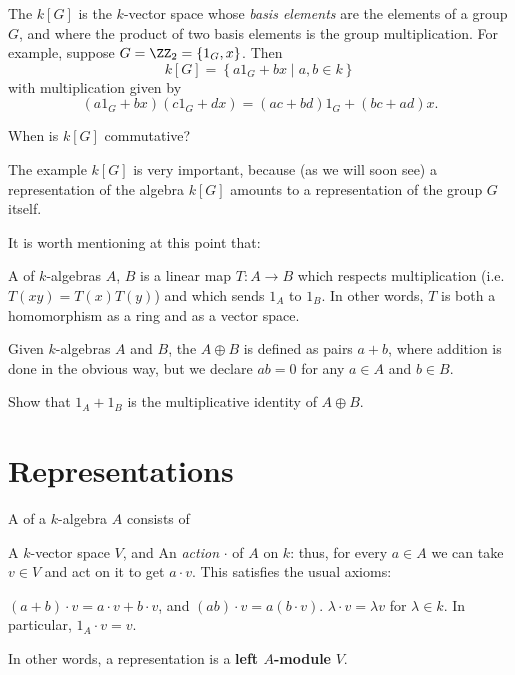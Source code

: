 \documentclass[11pt]{scrreprt}
\begin{document}
\begin{example}
	The  $k[G]$ is the $k$-vector space
	whose \emph{basis elements} are the elements of a group $G$,
	and where the product of two basis elements is the group multiplication.
	For example, suppose $G = \Zc 2 = \{1_G, x\}$.
	Then
	\[ k[G] = \left\{ a1_G + bx \mid a,b \in k \right\} \]
	with multiplication given by
	\[ (a1_G + bx)(c1_G+dx) = (ac+bd)1_G + (bc+ad)x. \]
\end{example}
\begin{ques}
	When is $k[G]$ commutative?
\end{ques}
The example $k[G]$ is very important,
because (as we will soon see) a representation of the algebra $k[G]$
amounts to a representation of the group $G$ itself.

It is worth mentioning at this point that:
\begin{definition}
	A  of $k$-algebras $A$, $B$ is a
	linear map $T : A \to B$ which respects multiplication
	(i.e.\ $T(xy) = T(x)T(y)$) and which sends $1_A$ to $1_B$.
	In other words, $T$ is both a homomorphism as a ring and as a vector space.
\end{definition}
\begin{definition}
	Given $k$-algebras $A$ and $B$, the  $A \oplus B$
	is defined as pairs $a + b$, where addition is done in the obvious way,
	but we declare $ab = 0$ for any $a \in A$ and $b \in B$.
\end{definition}
\begin{ques}
	Show that $1_A + 1_B$ is the multiplicative identity of $A \oplus B$.
\end{ques}

\section{Representations}

\begin{definition}
	A  of a $k$-algebra $A$ consists of
	\begin{enumerate}[(i)]
		\ii A $k$-vector space $V$, and
		\ii An \emph{action} $\cdot$ of $A$ on $k$: thus, for every $a \in A$
		we can take $v \in V$ and act on it to get $a \cdot v$.
		This satisfies the usual axioms:
		\begin{itemize}
			\ii $(a+b) \cdot v = a \cdot v + b \cdot v$,
			and $(ab) \cdot v = a(b \cdot v)$.
			\ii $\lambda \cdot v = \lambda v$ for $\lambda \in k$.
			In particular, $1_A \cdot v = v$.
		\end{itemize}
	\end{enumerate}
	In other words, a representation is a \textbf{left $A$-module} $V$.
\end{definition}
\end{document}
